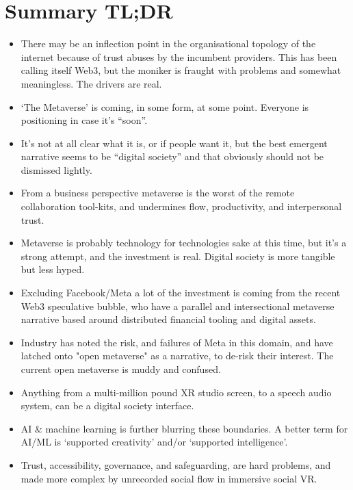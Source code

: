 \section{Summary TL;DR}
\label{sec:tldr}
\begin{itemize}
\item There may be an inflection point in the organisational topology of the internet because of trust abuses by the incumbent providers. This has been calling itself Web3, but the moniker is fraught with problems and somewhat meaningless. The drivers are real.
\item `The Metaverse' is coming, in some form, at some point. Everyone is positioning in case it's ``soon''.
\item It's not at all clear what it is, or if people want it, but the best emergent narrative seems to be ``digital society'' and that obviously should not be dismissed lightly.
\item From a business perspective metaverse is the worst of the remote collaboration tool-kits, and undermines flow, productivity, and interpersonal trust.
\item Metaverse is probably technology for technologies sake at this time, but it's a strong attempt, and the investment is real. Digital society is more tangible but less hyped.
\item Excluding Facebook/Meta a lot of the investment is coming from the recent Web3 speculative bubble, who have a parallel and intersectional metaverse narrative based around distributed financial tooling and digital assets. 
\item Industry has noted the risk, and failures of Meta in this domain, and have latched onto "open metaverse" as a narrative, to de-risk their interest. The current open metaverse is muddy and confused.
\item Anything from a multi-million pound XR studio screen, to a speech audio system, can be a digital society interface. 
\item AI \& machine learning is further blurring these boundaries. A better term for AI/ML is `supported creativity' and/or `supported intelligence'.
\item Trust, accessibility, governance, and safeguarding, are hard problems, and made more complex by unrecorded social flow in immersive social VR.

\end{itemize}
